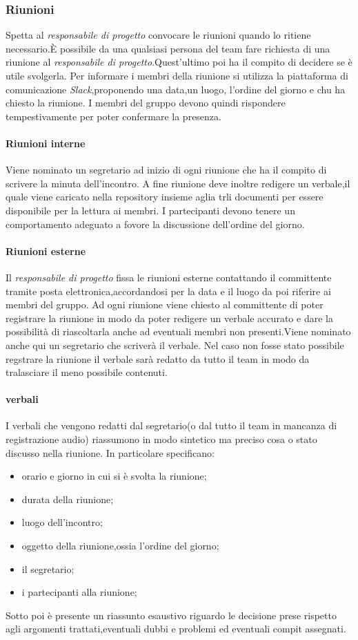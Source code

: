 \subsubsection{Riunioni}
			Spetta al \textit{responsabile di progetto} convocare le riunioni quando lo ritiene necessario.È possibile da una qualsiasi persona del team fare richiesta di una riunione al \textit{responsabile di progetto}.Quest'ultimo poi ha il compito di decidere se è utile svolgerla.  Per informare i membri della riunione si utilizza la piattaforma di comunicazione \textit{Slack},proponendo una data,un luogo, l'ordine del giorno e chu ha chiesto la riunione. I membri del gruppo devono quindi rispondere tempestivamente per poter confermare la presenza.
			\paragraph{Riunioni interne}
				Viene nominato un segretario ad inizio di ogni riunione che ha il compito di scrivere la minuta dell'incontro. A fine riunione deve inoltre redigere un verbale,il quale viene caricato nella repository insieme aglia trli documenti per essere disponibile per la lettura ai membri. I partecipanti devono tenere un comportamento adeguato a fovore la discussione dell'ordine del giorno.
			\paragraph{Riunioni esterne}
				Il \textit{responsabile di progetto} fissa le riunioni esterne contattando il committente tramite posta elettronica,accordandosi per la data e il luogo da poi riferire ai membri del gruppo.
				Ad ogni riunione viene chiesto al committente di poter registrare la riunione in modo da poter redigere un verbale accurato e dare la possibilità di riascoltarla anche ad eventuali membri non presenti.Viene nominato anche qui un segretario che scriverà il verbale. Nel caso non fosse stato possibile regstrare la riunione il verbale sarà redatto da tutto il team in modo da tralasciare il meno possibile contenuti.
			\paragraph{verbali}
				I verbali che vengono redatti dal segretario(o dal tutto il team in mancanza di registrazione audio) riassumono in modo sintetico ma preciso cosa o stato discusso nella riunione. 
				In particolare specificano:
				\begin{itemize}
					\item orario e giorno in cui si è svolta la riunione;
					\item durata della riunione;
					\item luogo dell'incontro;
					\item oggetto della riunione,ossia l'ordine del giorno;
					\item il segretario;
					\item i partecipanti alla riunione;
				\end{itemize}
				Sotto poi è presente un riassunto esaustivo riguardo le decisione prese rispetto agli argomenti trattati,eventuali dubbi e problemi ed eventuali compit assegnati.
